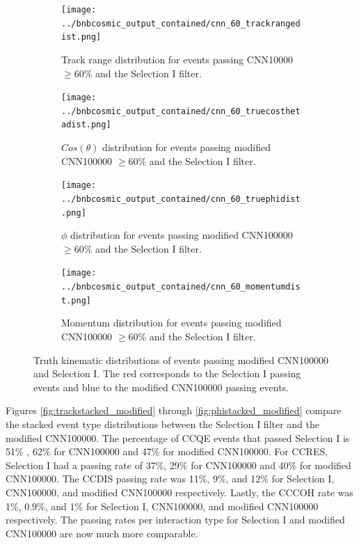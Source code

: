 \begin{figure}[htp!]
\centering
	\begin{subfigure}[b]{.475\textwidth}
	\centering
		\texttt{[image: ../bnbcosmic\_output\_contained/cnn\_60\_trackrangedist.png]}
		\caption{Track range distribution for events passing CNN10000 $\geq 60\%$ and the Selection I filter.} 
		\label{fig:cnn60trackrange_modified}
	\end{subfigure}
	\quad
	\begin{subfigure}[b]{.475\textwidth}
	\centering
		\texttt{[image: ../bnbcosmic\_output\_contained/cnn\_60\_truecosthetadist.png]}
		\caption{$Cos(\theta)$ distribution for events passing modified CNN100000 $\geq 60\%$ and the Selection I filter.} 
		\label{fig:cnn60costheta_modified}
	\end{subfigure}
	\quad
	\begin{subfigure}[b]{.475\textwidth}
	\centering
		\texttt{[image: ../bnbcosmic\_output\_contained/cnn\_60\_truephidist.png]}
		\caption{$\phi$ distribution for events passing modified CNN100000 $\geq 60\%$ and the Selection I filter.} 
		\label{fig:cnn60phi_modified}
	\end{subfigure}
	\quad
	\begin{subfigure}[b]{.475\textwidth}
	\centering
		\texttt{[image: ../bnbcosmic\_output\_contained/cnn\_60\_momentumdist.png]}
		\caption{Momentum distribution for events passing modified CNN100000 $\geq 60 \%$ and the Selection I filter.} 
		\label{fig:cnn60momentum_modified}
	\end{subfigure}
\caption{Truth kinematic distributions of events passing modified CNN100000 and Selection I. The red corresponds to the Selection I passing events and blue to the modified CNN100000 passing events.}
\label{fig:truthkinematics_modified}
\end{figure}

Figures \ref{fig:trackstacked_modified} through \ref{fig:phistacked_modified} compare the stacked event type distributions between the Selection I filter and the modified CNN100000. The percentage of CCQE events that passed Selection I is 51\% , 62\% for CNN100000 and 47\% for modified CNN100000. For CCRES, Selection I had a passing rate of 37\%, 29\% for CNN100000 and 40\% for modified CNN100000. The CCDIS passing rate was 11\%, 9\%, and 12\% for Selection I, CNN100000, and modified CNN100000 respectively. Lastly, the CCCOH rate was 1\%, 0.9\%, and 1\% for Selection I, CNN100000, and modified CNN100000 respectively. The passing rates per interaction type for Selection I and modified CNN100000 are now much more comparable.  

